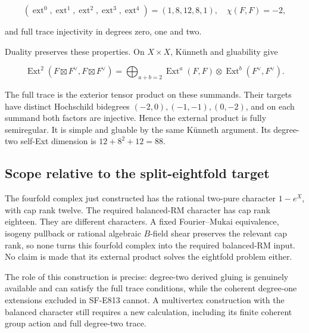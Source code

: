 \[
 (\operatorname{ext}^0,\operatorname{ext}^1,
   \operatorname{ext}^2,\operatorname{ext}^3,
   \operatorname{ext}^4)=(1,8,12,8,1),
 \quad\chi(F,F)=-2,
 \tag{E814.13}
\]

and full trace injectivity in degrees zero, one and two.

Duality preserves these properties. On \(X\times X\), Künneth and
gluability give

\[
 \operatorname{Ext}^2(F\boxtimes F^\vee,F\boxtimes F^\vee)
 =\bigoplus_{a+b=2}
   \operatorname{Ext}^a(F,F)\otimes
   \operatorname{Ext}^b(F^\vee,F^\vee).
\]

The full trace is the exterior tensor product on these summands. Their
targets have distinct Hochschild bidegrees \((-2,0),(-1,-1),(0,-2)\),
and on each summand both factors are injective. Hence the external
product is fully semiregular. It is simple and gluable by the same
Künneth argument. Its degree-two self-Ext dimension is \(12+8^2+12=88\).

\subsection{Scope relative to the split-eightfold
target}\label{SF-E814-scope-relative-to-the-split-eightfold-target}

The fourfold complex just constructed has the rational two-pure
character \(1-e^X\), with cap rank twelve. The required balanced-RM
character has cap rank eighteen. They are different characters. A fixed
Fourier--Mukai equivalence, isogeny pullback or rational algebraic
\(B\)-field shear preserves the relevant cap rank, so none turns this
fourfold complex into the required balanced-RM input. No claim is made
that its external product solves the eightfold problem either.

The role of this construction is precise: degree-two derived gluing is
genuinely available and can satisfy the full trace conditions, while the
coherent degree-one extensions excluded in SF-E813 cannot. A multivertex
construction with the balanced character still requires a new
calculation, including its finite coherent group action and full
degree-two trace.
